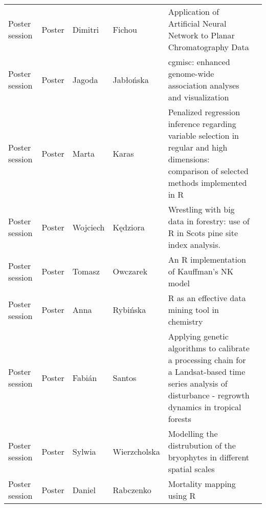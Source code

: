 \begin{longtable}{|p{2.6cm}|p{1.8cm}|p{1.9cm}|p{2.2cm}|p{9cm}|p{2.5cm}|}
  Poster session & Poster & Dimitri & Fichou & Application of Artificial Neural Network to Planar Chromatography Data &  \\ 
  Poster session & Poster & Jagoda & Jabłońska & cgmisc: enhanced genome-wide association analyses and visualization &  \\ 
  Poster session & Poster & Marta & Karas & Penalized regression inference regarding variable selection in regular and high dimensions: comparison of selected methods implemented in R &  \\ 
  Poster session & Poster & Wojciech & Kędziora & Wrestling with big data in forestry: use of R in Scots pine site index analysis. &  \\ 
  Poster session & Poster & Tomasz & Owczarek & An R implementation of Kauffman's NK model &  \\ 
  Poster session & Poster & Anna & Rybińska & R as an effective data mining tool in chemistry &  \\ 
  Poster session & Poster & Fabián & Santos & Applying genetic algorithms to calibrate a processing chain for a Landsat-based time series analysis of disturbance - regrowth dynamics in tropical forests &  \\ 
  Poster session & Poster & Sylwia & Wierzcholska & Modelling the distrubution of the bryophytes in different spatial scales &  \\ 
  Poster session & Poster & Daniel & Rabczenko & Mortality mapping using R &  \\ 
  \hline
\hline
\end{longtable}
\endgroup
